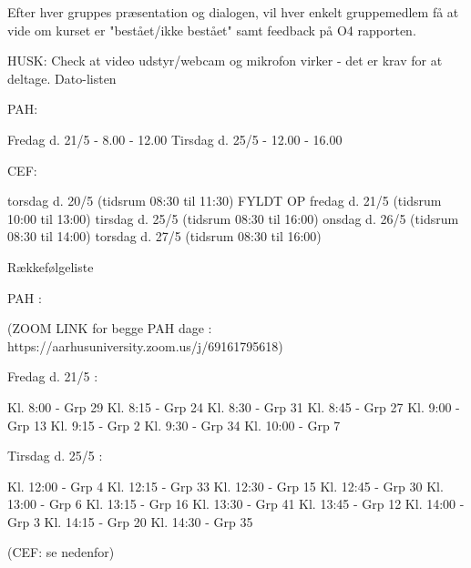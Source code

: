 Efter hver gruppes præsentation og dialogen, vil hver enkelt gruppemedlem få at vide om kurset er "bestået/ikke bestået" samt feedback på O4 rapporten. 

HUSK: Check at video udstyr/webcam og mikrofon virker - det er krav for at deltage.
Dato-listen

PAH:

    Fredag d. 21/5 - 8.00 - 12.00
    Tirsdag d. 25/5 - 12.00 - 16.00

CEF:

    torsdag d. 20/5   (tidsrum 08:30 til 11:30) FYLDT OP
    fredag d. 21/5      (tidsrum 10:00 til 13:00)
    tirsdag d. 25/5    (tidsrum 08:30 til 16:00)
    onsdag d. 26/5    (tidsrum 08:30 til 14:00)
    torsdag d. 27/5   (tidsrum 08:30 til 16:00)

Rækkefølgeliste 

PAH :

(ZOOM LINK for begge PAH dage :  https://aarhusuniversity.zoom.us/j/69161795618)

Fredag d. 21/5 :

    Kl. 8:00 - Grp 29
    Kl. 8:15 - Grp 24
    Kl. 8:30 - Grp 31
    Kl. 8:45 - Grp 27
    Kl. 9:00 - Grp 13
    Kl. 9:15 - Grp 2
    Kl. 9:30 - Grp 34  
    Kl. 10:00 - Grp 7

Tirsdag d. 25/5 :

    Kl. 12:00 - Grp 4 
    Kl. 12:15 - Grp 33
    Kl. 12:30 - Grp 15
    Kl. 12:45 - Grp 30
    Kl. 13:00 - Grp 6  
    Kl. 13:15 - Grp 16
    Kl. 13:30 - Grp 41
    Kl. 13:45 - Grp 12
    Kl. 14:00 - Grp 3
    Kl. 14:15 - Grp 20
    Kl. 14:30 - Grp 35    

(CEF: se nedenfor)